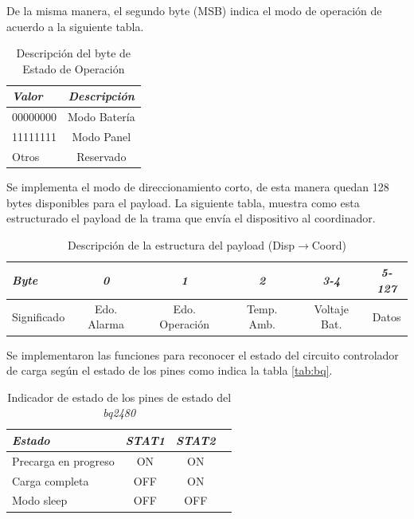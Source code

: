 {De la misma manera, el segundo byte (MSB) indica el modo de operación de acuerdo a la siguiente tabla.

\begin{table}[ht]
	\centering
	\caption{Descripción del byte de Estado de Operación}
	\begin{tabular}{@{} l *1c @{}}    \toprule
		\emph{\textbf{Valor}} & \emph{\textbf{Descripción}}\\
		\midrule
		00000000 &  Modo Batería\\
		11111111 &  Modo Panel\\
		Otros & Reservado\\
		\bottomrule
		\hline
	\end{tabular}
	\label{tab:STAT}
\end{table}

Se implementa el modo de direccionamiento corto, de esta manera quedan 128 bytes disponibles para el payload. La siguiente tabla, muestra como esta estructurado el payload de la trama que envía el dispositivo al coordinador.

\begin{table}[ht]
	\centering
	\caption{Descripción de la estructura del payload (Disp$\rightarrow$Coord)}
	\begin{tabular}{@{} l *5c @{}}    \toprule
		\emph{\textbf{Byte}} & \emph{\textbf{0}} & \emph{\textbf{1}} & \emph{\textbf{2}} & \emph{\textbf{3-4}} & \emph{\textbf{5-127}}\\
		\midrule
		Significado & Edo. Alarma & Edo. Operación & Temp. Amb. & Voltaje Bat. & Datos\\
		\bottomrule
		\hline
	\end{tabular}
	\label{tab:STAT}
\end{table}

Se implementaron las funciones para reconocer el estado del circuito controlador de carga según el estado de los pines como indica la tabla \ref{tab:bq}.

\begin{table}[ht]
	\centering
	\caption{Indicador de estado de los pines de estado del \textit{bq2480}}
	\begin{tabular}{@{} l *3c @{}}    \toprule
		\emph{\textbf{Estado}} & \emph{\textbf{STAT1}} & \emph{\textbf{STAT2}}\\
		\midrule
		Precarga en progreso &  ON & ON \\	
		Carga completa &  OFF & ON \\
		Modo sleep &  OFF & OFF \\
		\bottomrule
		\hline
	\end{tabular}
	\label{tab:STAT}
\end{table}

}
